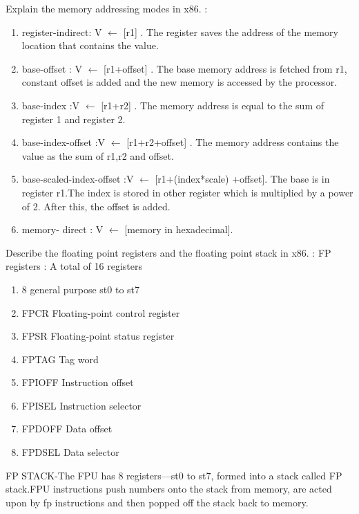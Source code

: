\begin{ExerciseList}
\Exercise
Explain the memory addressing modes in x86.
\Answer :
\begin{enumerate}
\item register-indirect: V $\leftarrow$ [r1] . The register saves the address of the memory location that contains the value.
\item base-offset : V $\leftarrow$ [r1+offset] . The base memory address is fetched from r1, constant offset is added and the new memory is accessed by the processor.
\item base-index :V $\leftarrow$ [r1+r2] . The memory address is equal to the sum of register 1 and register 2.
\item base-index-offset :V $\leftarrow$ [r1+r2+offset] . The memory address contains the value as the sum of r1,r2 and offset.
\item base-scaled-index-offset :V $\leftarrow$ [r1+(index*scale) +offset]. The base is in register r1.The index is stored in other register which is multiplied by a power of 2. After this, the offset is added.  
\item memory- direct : V $\leftarrow$ [memory in hexadecimal].
\end{enumerate}

\Exercise
Describe the floating point registers and the floating point stack in x86.
\Answer :
FP registers : A total of 16 registers
\begin{enumerate}
\item 8 general purpose st0 to st7
\item  FPCR Floating-point control register
\item  FPSR Floating-point status register
\item  FPTAG Tag word
\item  FPIOFF Instruction offset
\item  FPISEL Instruction selector
\item  FPDOFF Data offset
\item  FPDSEL Data selector
\end{enumerate}

FP STACK-The FPU has 8 registers---st0 to st7, formed into a stack called FP stack.FPU instructions push numbers onto the stack from memory, are acted upon by fp instructions and then popped off the stack back to memory.\\


\end{ExerciseList}
